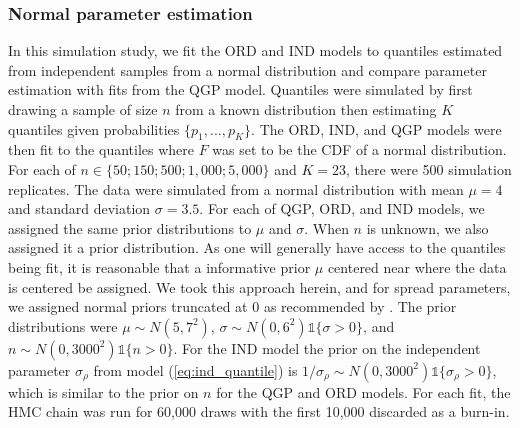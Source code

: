 \subsubsection{Normal parameter estimation}
In this simulation study, we fit the ORD and IND models to quantiles estimated 
from independent samples from a normal distribution and compare parameter 
estimation with fits from the QGP model. Quantiles were simulated by first 
drawing a sample of size $n$ from a known distribution then estimating $K$ 
quantiles given probabilities $\{p_1, ..., p_K\}$. The ORD, IND, and QGP models 
were then fit to the quantiles where $F$ was set to be the CDF of a normal 
distribution. For each of 
$n \in \{50; 150; 500; 1{,}000; 5{,}000\}$ and 
$K = 23$, there 
were 500 simulation replicates. The data were simulated from a normal 
distribution with mean $\mu = 4$ and standard deviation $\sigma = 3.5$.
For each of QGP, ORD, and IND models, we assigned the same prior distributions 
to $\mu$ and $\sigma$. When $n$ is unknown, we also assigned it a prior 
distribution. 
As one will generally have access to the quantiles being fit, 
it is reasonable that a informative prior $\mu$ centered near where the data is
centered be assigned. We took this approach herein, and for spread parameters,
we assigned normal priors truncated at 0 as recommended by
\cite{gelman2006prior}.
The prior distributions were $\mu \sim N(5,7^2)$,
$\sigma \sim N(0, 6^2) \mathds{1} \{\sigma > 0\}$, and
$n \sim N(0,3000^2)\mathds{1}\{n > 0\}$.
For the IND model the prior on the independent parameter 
$\sigma_{\rho}$ from model (\ref{eq:ind_quantile}) is 
$1/\sigma_{\rho} \sim N(0, 3000^2)\mathds{1}\{\sigma_{\rho} > 0\}$,
which is similar to the prior on $n$ for 
the QGP and ORD models. For each fit, the HMC chain was run for 60,000 draws 
with the first 10,000 discarded as a burn-in.

